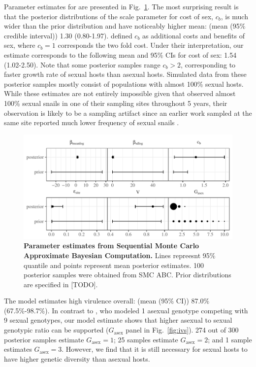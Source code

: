 \documentclass{article}\usepackage[]{graphicx}\usepackage[]{color}
\newcommand{\fref}[1]{Fig.~\ref{fig:#1}}
\begin{document}
Parameter estimates for \cite{vergara2014infection} are presented in \fref{smcparam}.
The most surprising result is that the posterior distributions of the scale parameter for cost of sex, $c_b$, is much wider than the prior distribution and have noticeably higher mean: (mean (95\% credible interval)) 1.30 (0.80-1.97).
\cite{ashby2015diversity} defined $c_b$ as additional costs and benefits of sex, where $c_b=1$ corresponds the two fold cost.
Under their interpretation, our estimate corresponds to the following mean and 95\% CIs for cost of sex: 1.54 (1.02-2.50).
Note that some posterior samples range $c_b > 2$, corresponding to faster growth rate of sexual hosts than asexual hosts.
Simulated data from these posterior samples mostly consist of populations with almost 100\% sexual hosts.
While these estimates are not entirely impossible given that \cite{vergara2014infection} observed almost 100\% sexual snails in one of their sampling sites throughout 5 years, their observation is likely to be a sampling artifact since an earlier work sampled at the same site reported much lower frequency of sexual snails \citep{vergara2013geographic}. %

\begin{figure}[!ht]
\includegraphics[width=\textwidth]{../fig/verg_post.pdf}
\caption{{\bf Parameter estimates from Sequential Monte Carlo Approximate Bayesian Computation.}
Lines repreesnt 95\% quantile and points represent mean posterior estimates. 100 posterior samples were obtained from SMC ABC. Prior distributions are specified in [TODO].
}
\label{fig:smcparam}
\end{figure}

The model estimates high virulence overall: (mean (95\% CI)) 87.0\% (67.5\%-98.7\%).
In contrast to \cite{lively2010epidemiological}, who modeled 1 asexual genotype competing with 9 sexual genotypes, our model estimate shows that higher asexual to sexual genotypic ratio can be supported ($G_{\textrm{asex}}$ panel in \fref{ivs}).
274 out of 300 posterior samples estimate $G_{\textrm{asex}} = 1$; 25 samples estimate $G_{\textrm{asex}} = 2$; and 1 sample estimates $G_{\textrm{asex}} = 3$.
However, we find that it is still necessary for sexual hosts to have higher genetic diversity than asexual hosts.
\end{document}
